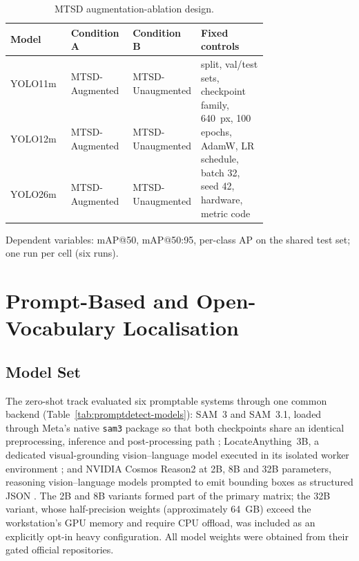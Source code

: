 \begin{table}[htbp]
\centering
\caption{MTSD augmentation-ablation design.}
\label{tab:ablation}
\small
\begin{tabular}{lp{0.24\linewidth}p{0.24\linewidth}p{0.26\linewidth}}
\hline
\textbf{Model} & \textbf{Condition A} & \textbf{Condition B} & \textbf{Fixed controls} \\
\hline
YOLO11m & MTSD-Augmented & MTSD-Unaugmented & \multirow{3}{0.26\linewidth}{split, val/test sets, checkpoint family, 640~px, 100 epochs, AdamW, LR schedule, batch 32, seed 42, hardware, metric code} \\
YOLO12m & MTSD-Augmented & MTSD-Unaugmented & \\
YOLO26m & MTSD-Augmented & MTSD-Unaugmented & \\
\hline
\end{tabular}

\vspace{2pt}
{\footnotesize Dependent variables: mAP@50, mAP@50:95, per-class AP on the shared test set; one run per cell (six runs).}
\end{table}

\section{Prompt-Based and Open-Vocabulary Localisation}
\label{sec:promptdetect-methodology}

\subsection{Model Set}

The zero-shot track evaluated six promptable systems through one common backend (Table~\ref{tab:promptdetect-models}): SAM~3 and SAM~3.1, loaded through Meta's native \texttt{sam3} package so that both checkpoints share an identical preprocessing, inference and post-processing path \citep{meta2025sam3,meta2026sam31}; LocateAnything~3B, a dedicated visual-grounding vision--language model executed in its isolated worker environment \citep{nvidia2026locateanything}; and NVIDIA Cosmos Reason2 at 2B, 8B and 32B parameters, reasoning vision--language models prompted to emit bounding boxes as structured JSON \citep{nvidia2025cosmosreason2}. The 2B and 8B variants formed part of the primary matrix; the 32B variant, whose half-precision weights (approximately 64~GB) exceed the workstation's GPU memory and require CPU offload, was included as an explicitly opt-in heavy configuration. All model weights were obtained from their gated official repositories.

